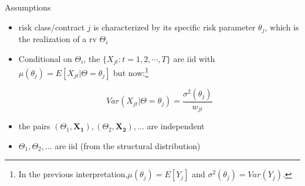 \documentclass[11pt]{beamer}
\begin{document}
\begin{frame}{Assumptions}
\begin{itemize}
\item risk class/contract $j$ is characterized by its specific risk parameter $\theta_j$, which is the realization of a rv $\Theta_i$ 

\vfill

\item Conditional on $\Theta_i$, the $\{X_{jt}:t=1,2,\cdots,T\}$ are iid with $\mu(\theta_j)=E[X_{jt}|\Theta=\theta_j]$ \alert{but now:}\footnote{In the previous interpretation,$\mu(\theta_j)=E[Y_j]$ and $\sigma^2(\theta_j) = Var(Y_j)$. }

 $$Var(X_{jt}|\Theta=\theta_j)=\frac{\sigma^2(\theta_j)}{w_{jt}}$$
 

\vfill

\item the pairs $(\Theta_1,\mathbf{X_1}),(\Theta_2,\mathbf{X_2}),\ldots$ are independent

\vfill

\item $\Theta_1,\Theta_2,\ldots$ are iid (from the structural distribution)
\end{itemize}
\end{frame}
\end{document}
